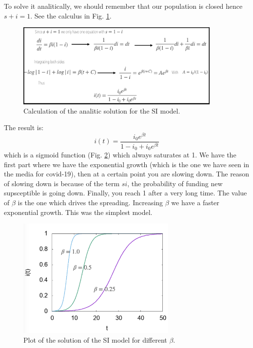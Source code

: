 \documentclass[../main/main.tex]{subfiles}
\begin{document}
To solve it analitically, we should remember that our population is closed hence \( s+i=1 \). See the calculus in Fig. \ref{fig:3_1}.
\begin{figure}[h!]
\centering
\includegraphics[width=0.9\textwidth]{../lessons/image/03/1.png}
\caption{\label{fig:3_1} Calculation of the analitic solution for the SI model.}
\end{figure}
The result is:
\begin{equation*}
  i(t) = \frac{i_0 e^{\beta t} }{1-i_0 + i_0 e^{\beta t} }
\end{equation*}
which is a sigmoid function (Fig. \ref{fig:3_2}) which always saturates at 1. We have the first part where we have the exponential growth (which is the one we have seen in the media for covid-19), then at a certain point you are slowing down. The reason of slowing down is because of the term \( s i \), the probability of funding new supsceptible is going down. Finally, you reach 1 after a very long time. The value of \( \beta  \) is the one which drives the spreading. Increasing \( \beta  \) we have a faster exponential growth.
This was the simplest model.

\begin{figure}[h!]
\centering
\includegraphics[width=0.7\textwidth]{../lessons/image/03/2.png}
\caption{\label{fig:3_2} Plot of the solution of the SI model for different \( \beta  \).}
\end{figure}
\end{document}
